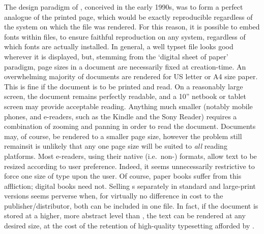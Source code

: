 The design paradigm of \pdf{}, conceived in the early 1990s\cite{Warnock1991}, was to form a perfect
analogue of the printed page, which would be exactly reproducible regardless of the system on which
the file was rendered. For this reason, it is possible to embed fonts within \pdf{} files, to ensure
faithful reproduction on any system, regardless of which fonts are actually installed. In general, a
well typset \pdf{} file looks good wherever it is displayed, but, stemming from the `digital sheet
of paper' paradigm, page sizes in a \pdf{} document are necessarily fixed at creation-time. An
overwhelming majority of \pdf{} documents are rendered for  US letter or A4 size paper. This is fine
if the document is to be printed and read. On a reasonably large screen, the document remains
perfectly readable, and a 10'' netbook or tablet screen may provide acceptable reading. Anything much
smaller (notably mobile phones, and e-readers, such as the Kindle and the Sony Reader) requires
a combination of zooming and panning 
in order to read the document. Documents may, of course, be rendered to a smaller page size, however
the problem still remains\ed it is unlikely that any one page size will be suited to \emph{all}
reading platforms. Most e-readers, using their native (i.e.\ non-\pdf{}) formats, allow text to be
resized according to user preference. Indeed, it seems unnecessarily restrictive to force one size
of type upon the user. Of course, paper books suffer from this affliction; digital books need not.
Selling \ebook{}s separately in standard and large-print versions seems perverse when, for virtually
no difference in cost to the publisher/distributor, both can be included in one file. In fact,
if the document is stored at a higher, more abstract level than \pdf{}, the text can be rendered
at any desired size, at the cost of the retention of high-quality typesetting afforded by \pdf{}.


